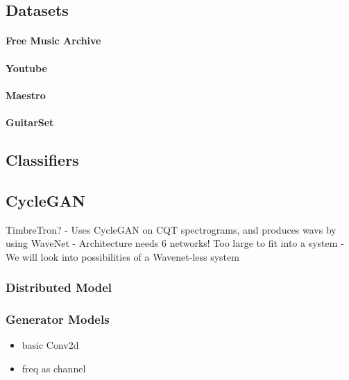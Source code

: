 \documentclass[]{article}
\providecommand{\tightlist}{%
  \setlength{\itemsep}{0pt}\setlength{\parskip}{0pt}}
\begin{document}
\hypertarget{datasets}{%
\subsection{Datasets}\label{datasets}}

\paragraph{Free Music Archive}

\paragraph{Youtube}

\paragraph{Maestro}

\paragraph{GuitarSet}

\hypertarget{classifiers}{%
\subsection{Classifiers}\label{classifiers}}

\hypertarget{cyclegan-1}{%
\subsection{CycleGAN}\label{cyclegan-1}}

TimbreTron? - Uses CycleGAN on CQT spectrograms, and produces wavs by
using WaveNet - Architecture needs 6 networks! Too large to fit into a
system - We will look into possibilities of a Wavenet-less system

\hypertarget{distributed-model}{%
\subsubsection{Distributed Model}\label{distributed-model}}

\hypertarget{generator-models}{%
\subsubsection{Generator Models}\label{generator-models}}

\begin{itemize}
\tightlist
\item
  basic Conv2d
\item
  freq as channel
\end{itemize}
\end{document}
